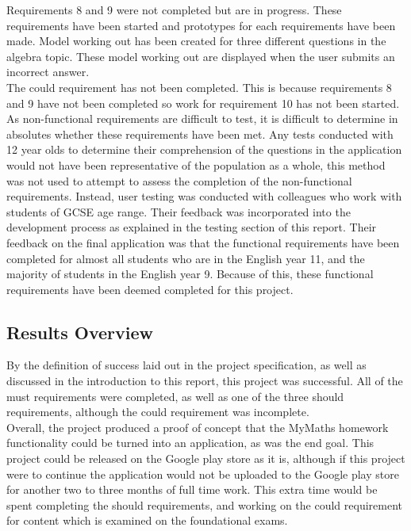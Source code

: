 \documentclass{article}
\begin{document}
Requirements 8 and 9 were not completed but are in progress. These requirements have been started and prototypes for each requirements have been made. Model working out has been created for three different questions in the algebra topic. These model working out are displayed when the user submits an incorrect answer. \\

The could requirement has not been completed. This is because requirements 8 and 9 have not been completed so work for requirement 10 has not been started. \\

As non-functional requirements are difficult to test, it is difficult to determine in absolutes whether these requirements have been met. Any tests conducted with 12 year olds to determine their comprehension of the questions in the application would not have been representative of the population as a whole, this method was not used to attempt to assess the completion of the non-functional requirements. Instead, user testing was conducted with colleagues who work with students of GCSE age range. Their feedback was incorporated into the development process as explained in the testing section of this report. Their feedback on the final application was that the functional requirements have been completed for almost all students who are in the English year 11, and the majority of students in the English year 9. Because of this, these functional requirements have been deemed completed for this project. \\

\subsection{Results Overview}

By the definition of success laid out in the project specification, as well as discussed in the introduction to this report, this project was successful. All of the must requirements were completed, as well as one of the three should requirements, although the could requirement was incomplete. \\

Overall, the project produced a proof of concept that the MyMaths homework functionality could be turned into an application, as was the end goal. This project could be released on the Google play store as it is, although if this project were to continue the application would not be uploaded to the Google play store for another two to three months of full time work. This extra time would be spent completing the should requirements, and working on the could requirement for content which is examined on the foundational exams. \\
\end{document}
